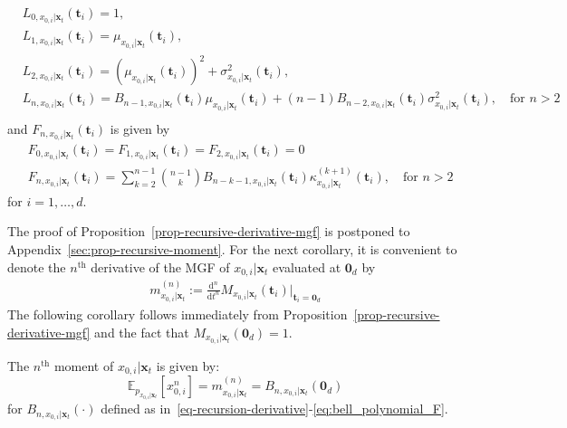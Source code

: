 \begin{proposition}
\begin{equation}
\begin{aligned} \label{eq:bell_polynomial_L}
&L_{0,{x}_{0,i}|{\mathbf{x}_t}}(\mathbf{t}_i) = 1, \\
&L_{1,{x}_{0,i}|{\mathbf{x}_t}}(\mathbf{t}_i) = \mu_{{x}_{0,i}\vert{\mathbf{x}_t}} (\mathbf{t}_i),\\
&L_{2,{x}_{0,i}|{\mathbf{x}_t}}(\mathbf{t}_i) = (\mu_{{x}_{0,i}\vert{\mathbf{x}_t}}(\mathbf{t}_i))^2+ \sigma_{{x}_{0,i}\vert{\mathbf{x}_t}}^2(\mathbf{t}_i),\\
&L_{n,{x}_{0,i}|{\mathbf{x}_t}}(\mathbf{t}_i) = B_{n-1,{x}_{0,i}\vert{\mathbf{x}_t}}(\mathbf{t}_i) \mu_{{x}_{0,i}\vert{\mathbf{x}_t}}(\mathbf{t}_i)+ (n-1)B_{n-2,{x}_{0,i}\vert{\mathbf{x}_t}}(\mathbf{t}_i)\sigma_{{x}_{0,i}\vert{\mathbf{x}_t}}^2(\mathbf{t}_i), \quad \text{for } n>2\\
\end{aligned}
\end{equation} 
and $F_{n,{x}_{0,i}|{\mathbf{x}_t}}(\mathbf{t}_i)$ is given by
\begin{equation}
\begin{aligned} \label{eq:bell_polynomial_F}
&F_{0,{x}_{0,i}\vert{\mathbf{x}_t}}(\mathbf{t}_i) = F_{1,{x}_{0,i}\vert{\mathbf{x}_t}}(\mathbf{t}_i) = F_{2,{x}_{0,i}\vert{\mathbf{x}_t}}(\mathbf{t}_i) = 0\\
&F_{n,{x}_{0,i}|{\mathbf{x}_t}}(\mathbf{t}_i) = \sum_{k=2}^{n-1}{n-1\choose k}B_{n-k-1,{x}_{0,i}\vert{\mathbf{x}_t}}(\mathbf{t}_i)\kappa^{(k+1)}_{{x}_{0,i}\vert \mathbf{x}_t} (\mathbf{t}_i), \quad \text{for } n>2
\end{aligned}
\end{equation}
for $i=1,\ldots,d$.
\end{proposition}
The proof of Proposition~\ref{prop-recursive-derivative-mgf} is postponed to Appendix~\ref{sec:prop-recursive-moment}. 
%
%
For the next corollary, it is convenient to denote the $n^{\text{th}}$ derivative of the MGF of $x_{0,i}\vert \mathbf{x}_{t}$ evaluated at $\mathbf{0}_d$ by
\begin{align}
\label{eq:derivative_moment_generating_function}
    m^{(n)}_{x_{0,i} \vert \mathbf{x}_t} := \frac{\mathrm{d}^{n}}{\mathrm{d}t^{n}} M_{x_{0,i} \vert \mathbf{x}_t}(\mathbf{t}_i)|_{\mathbf{t}_i =\boldsymbol{0}_d}
\end{align}
The following corollary follows immediately from Proposition~\ref{prop-recursive-derivative-mgf} and the fact that $M_{x_{0,i}\vert\mathbf{x}_{t}}(\mathbf{0}_d) = 1 $.
\begin{corollary}
\label{corollary-moment-tweedie}
The $n^{\text{th}}$ moment of $x_{0,i}\vert \mathbf{x}_{t}$ is given by:
\begin{equation}
\mathbb{E}_{p_{x_{0,i}\vert\mathbf{x}_{t}}}[x_{0,i}^{n}] = m^{(n)}_{x_{0,i} \vert \mathbf{x}_t}  = B_{n,{x}_{0,i}\vert\mathbf{x}_{t}}(\boldsymbol{0}_d)
\end{equation}
for $B_{n,{x}_{0,i}\vert\mathbf{x}_{t}}(\cdot)$ defined as in~\eqref{eq-recursion-derivative}-\eqref{eq:bell_polynomial_F}.
\end{corollary}
